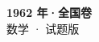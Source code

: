 \documentclass[zihao=-4, a4paper]{ctexart}
\begin{document}
\begin{center}
  {\Large\bfseries 1962 年·全国卷}\\[4pt]
  {\large 数学 · 试题版}
\end{center}
\medskip
{}

\end{document}
